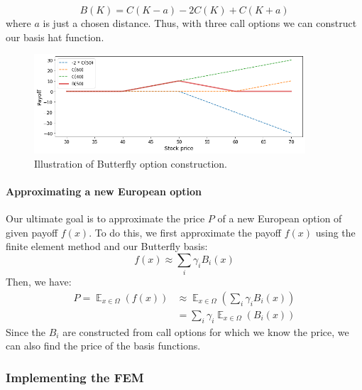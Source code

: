 \documentclass[a4paper,12pt]{article}
\begin{document}
\begin{equation}
    B(K) = C(K-a) -2C(K) + C(K+a)
\end{equation}
where $a$ is just a chosen distance. Thus, with three call options we can construct our basis hat function.
\begin{figure} [H]
    \centering
    \includegraphics[width=0.9\textwidth]{butterfly_illustration.png}
    \caption{Illustration of Butterfly option construction.}
    \label{fig:butterfly}
\end{figure}

\paragraph{Approximating a new European option}
Our ultimate goal is to approximate the price $P$ of a new European option of given payoff $f(x)$. To do this, we first approximate the payoff $f(x)$ using the finite element method and our Butterfly basis:
\begin{equation}
    f(x) \approx \sum_i \gamma_i B_i(x)
\end{equation}
Then, we have:
\begin{equation}
\begin{split}
    P = \displaystyle \mathop{\mathbb{E}}_{x\in \Omega}(f(x)) &\approx \displaystyle \mathop{\mathbb{E}}_{x\in \Omega}(\sum_i \gamma_i B_i(x))\\
    &= \sum_i \gamma_i \displaystyle \mathop{\mathbb{E}}_{x\in \Omega}(B_i(x))
\end{split}
\end{equation}
Since the $B_i$ are constructed from call options for which we know the price, we can also find the price of the basis functions.

\subsubsection{Implementing the FEM}
\end{document}
